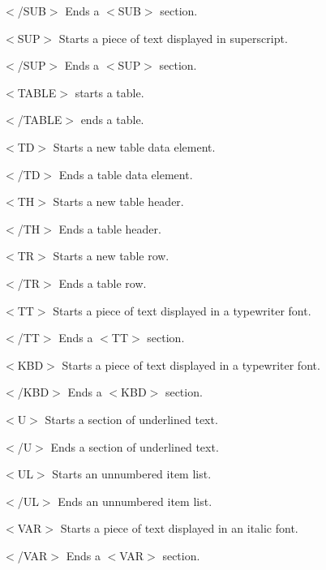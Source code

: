 \begin{DoxyItemize}
\item {\ttfamily $<$/\+S\+UB$>$} Ends a {\ttfamily $<$S\+UB$>$} section. 
\item {\ttfamily $<$S\+UP$>$} Starts a piece of text displayed in superscript. 
\item {\ttfamily $<$/\+S\+UP$>$} Ends a {\ttfamily $<$S\+UP$>$} section. 
\item {\ttfamily $<$T\+A\+B\+LE$>$} starts a table. 
\item {\ttfamily $<$/\+T\+A\+B\+LE$>$} ends a table. 
\item {\ttfamily $<$TD$>$} Starts a new table data element. 
\item {\ttfamily $<$/\+TD$>$} Ends a table data element. 
\item {\ttfamily $<$TH$>$} Starts a new table header. 
\item {\ttfamily $<$/\+TH$>$} Ends a table header. 
\item {\ttfamily $<$TR$>$} Starts a new table row. 
\item {\ttfamily $<$/\+TR$>$} Ends a table row. 
\item {\ttfamily $<$TT$>$} Starts a piece of text displayed in a typewriter font. 
\item {\ttfamily $<$/\+TT$>$} Ends a {\ttfamily $<$TT$>$} section. 
\item {\ttfamily $<$K\+BD$>$} Starts a piece of text displayed in a typewriter font. 
\item {\ttfamily $<$/\+K\+BD$>$} Ends a {\ttfamily $<$K\+BD$>$} section. 
\item {\ttfamily $<$U$>$} Starts a section of underlined text. 
\item {\ttfamily $<$/U$>$} Ends a section of underlined text. 
\item {\ttfamily $<$UL$>$} Starts an unnumbered item list. 
\item {\ttfamily $<$/\+UL$>$} Ends an unnumbered item list. 
\item {\ttfamily $<$V\+AR$>$} Starts a piece of text displayed in an italic font. 
\item {\ttfamily $<$/\+V\+AR$>$} Ends a {\ttfamily $<$V\+AR$>$} section. 
\end{DoxyItemize}


